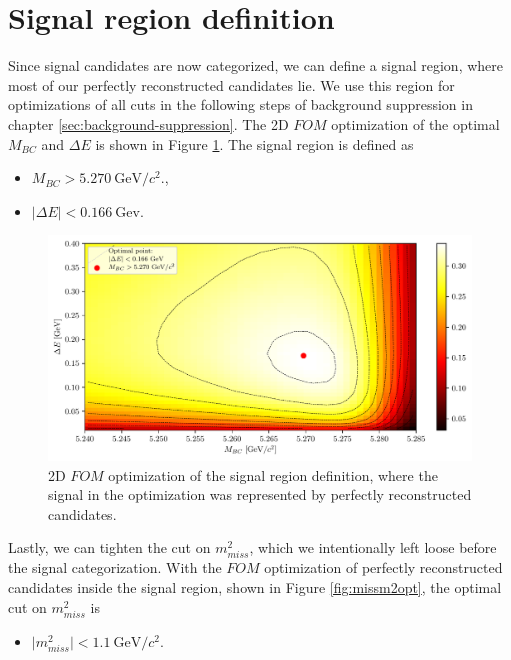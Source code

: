 \documentclass[  headings=standardclasses,
  headings=big,oneside,a4paper,openany,12pt]{scrbook}
\newcommand {\e}[1]{\mathrm{~#1}}
\begin{document}
\section{Signal region definition}

Since signal candidates are now categorized, we can define a signal region, where most of our perfectly reconstructed candidates lie. We use this region for optimizations of all cuts in the following steps of background suppression in chapter \ref{sec:background-suppression}. The 2D $FOM$ optimization of the optimal $M_{BC}$ and $\Delta E$ is shown in Figure \ref{fig:sigwin}.
The signal region is defined as
\begin{itemize}
\item $M_{BC} > 5.270\e{GeV}/c^2.$,
\item $\vert \Delta E \vert < 0.166\e{Gev}$. 
\end{itemize}

\begin{figure}[H]
\centering
\captionsetup{width=0.8\linewidth}
\includegraphics[width=\linewidth]{fig/sigWin}
\caption{2D $FOM$ optimization of the signal region definition, where the signal in the optimization was represented by perfectly reconstructed candidates.}
\label{fig:sigwin}
\end{figure}

Lastly, we can tighten the cut on $m_{miss}^2$, which we intentionally left loose before the signal categorization. With the $FOM$ optimization of perfectly reconstructed candidates inside the signal region, shown in Figure \ref{fig:missm2opt}, the optimal cut on $m_{miss}^2$ is 

\begin{itemize}
\item $\vert m_{miss}^2 \vert < 1.1\e{GeV}/c^2$.
\end{itemize}
\end{document}
